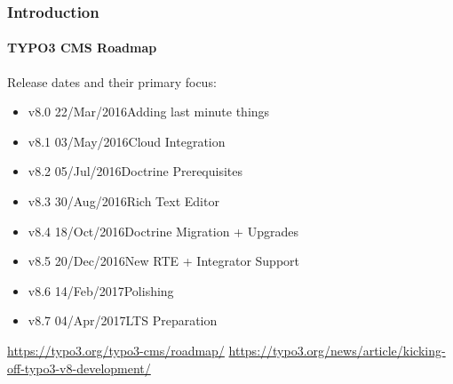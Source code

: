\begin{frame}[fragile]
	\frametitle{Introduction}
	\framesubtitle{TYPO3 CMS Roadmap}

	Release dates and their primary focus:

	\begin{itemize}

		\item v8.0 \tabto{1.1cm}22/Mar/2016\tabto{3.4cm}Adding last minute things
		\item v8.1 \tabto{1.1cm}03/May/2016\tabto{3.4cm}Cloud Integration
		\item v8.2 \tabto{1.1cm}05/Jul/2016\tabto{3.4cm}Doctrine Prerequisites
		\item v8.3 \tabto{1.1cm}30/Aug/2016\tabto{3.4cm}Rich Text Editor
		\item v8.4 \tabto{1.1cm}18/Oct/2016\tabto{3.4cm}Doctrine Migration + Upgrades
		\item v8.5 \tabto{1.1cm}20/Dec/2016\tabto{3.4cm}New RTE + Integrator Support
		\item
			\begingroup
				\color{typo3orange}
					v8.6 \tabto{1.1cm}14/Feb/2017\tabto{3.4cm}Polishing
			\endgroup
		\item v8.7 \tabto{1.1cm}04/Apr/2017\tabto{3.4cm}LTS Preparation

	\end{itemize}

	\smaller
		\url{https://typo3.org/typo3-cms/roadmap/}\newline
		\url{https://typo3.org/news/article/kicking-off-typo3-v8-development/}
	\normalsize

\end{frame}

